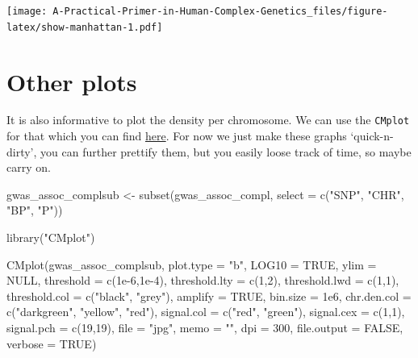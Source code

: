 \documentclass[
]{book}
\newenvironment{Shaded}{\begin{snugshade}}{\end{snugshade}}
\newcommand{\AttributeTok}[1]{\textcolor[rgb]{0.77,0.63,0.00}{#1}}
\newcommand{\ConstantTok}[1]{\textcolor[rgb]{0.00,0.00,0.00}{#1}}
\newcommand{\DecValTok}[1]{\textcolor[rgb]{0.00,0.00,0.81}{#1}}
\newcommand{\FloatTok}[1]{\textcolor[rgb]{0.00,0.00,0.81}{#1}}
\newcommand{\FunctionTok}[1]{\textcolor[rgb]{0.00,0.00,0.00}{#1}}
\newcommand{\NormalTok}[1]{#1}
\newcommand{\OtherTok}[1]{\textcolor[rgb]{0.56,0.35,0.01}{#1}}
\newcommand{\StringTok}[1]{\textcolor[rgb]{0.31,0.60,0.02}{#1}}
\begin{document}
\texttt{[image: A-Practical-Primer-in-Human-Complex-Genetics\_files/figure-latex/show-manhattan-1.pdf]}

\hypertarget{other-plots}{%
\section{Other plots}\label{other-plots}}

It is also informative to plot the density per chromosome. We can use the \texttt{CMplot} for that which you can find \href{https://github.com/YinLiLin/R-CMplot}{here}. For now we just make these graphs `quick-n-dirty', you can further prettify them, but you easily loose track of time, so maybe carry on.

\begin{Shaded}
\begin{Highlighting}[]
\NormalTok{gwas\_assoc\_complsub }\OtherTok{\textless{}{-}} \FunctionTok{subset}\NormalTok{(gwas\_assoc\_compl, }\AttributeTok{select =} \FunctionTok{c}\NormalTok{(}\StringTok{"SNP"}\NormalTok{, }\StringTok{"CHR"}\NormalTok{, }\StringTok{"BP"}\NormalTok{, }\StringTok{"P"}\NormalTok{))}
\end{Highlighting}
\end{Shaded}

\begin{Shaded}
\begin{Highlighting}[]
\FunctionTok{library}\NormalTok{(}\StringTok{"CMplot"}\NormalTok{)}

\FunctionTok{CMplot}\NormalTok{(gwas\_assoc\_complsub,}
       \AttributeTok{plot.type =} \StringTok{"b"}\NormalTok{, }\AttributeTok{LOG10 =} \ConstantTok{TRUE}\NormalTok{, }\AttributeTok{ylim =} \ConstantTok{NULL}\NormalTok{,}
       \AttributeTok{threshold =} \FunctionTok{c}\NormalTok{(}\FloatTok{1e{-}6}\NormalTok{,}\FloatTok{1e{-}4}\NormalTok{), }\AttributeTok{threshold.lty =} \FunctionTok{c}\NormalTok{(}\DecValTok{1}\NormalTok{,}\DecValTok{2}\NormalTok{), }\AttributeTok{threshold.lwd =} \FunctionTok{c}\NormalTok{(}\DecValTok{1}\NormalTok{,}\DecValTok{1}\NormalTok{), }\AttributeTok{threshold.col =} \FunctionTok{c}\NormalTok{(}\StringTok{"black"}\NormalTok{, }\StringTok{"grey"}\NormalTok{),}
       \AttributeTok{amplify =} \ConstantTok{TRUE}\NormalTok{,}
       \AttributeTok{bin.size =} \FloatTok{1e6}\NormalTok{, }\AttributeTok{chr.den.col =} \FunctionTok{c}\NormalTok{(}\StringTok{"darkgreen"}\NormalTok{, }\StringTok{"yellow"}\NormalTok{, }\StringTok{"red"}\NormalTok{),}
       \AttributeTok{signal.col =} \FunctionTok{c}\NormalTok{(}\StringTok{"red"}\NormalTok{, }\StringTok{"green"}\NormalTok{), }\AttributeTok{signal.cex =} \FunctionTok{c}\NormalTok{(}\DecValTok{1}\NormalTok{,}\DecValTok{1}\NormalTok{), }\AttributeTok{signal.pch =} \FunctionTok{c}\NormalTok{(}\DecValTok{19}\NormalTok{,}\DecValTok{19}\NormalTok{),}
       \AttributeTok{file =} \StringTok{"jpg"}\NormalTok{, }\AttributeTok{memo =} \StringTok{""}\NormalTok{, }\AttributeTok{dpi =} \DecValTok{300}\NormalTok{, }\AttributeTok{file.output =} \ConstantTok{FALSE}\NormalTok{, }\AttributeTok{verbose =} \ConstantTok{TRUE}\NormalTok{)}
\end{Highlighting}
\end{Shaded}
\end{document}
